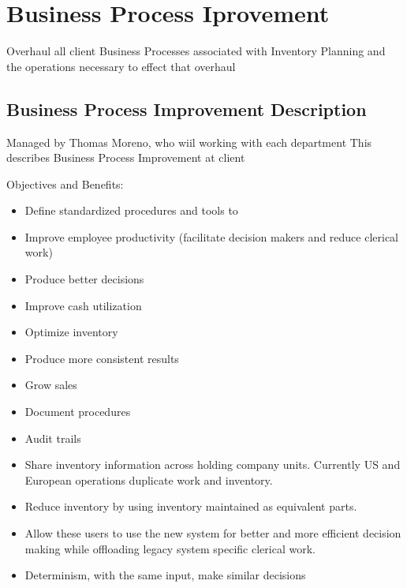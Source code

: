 \documentclass[letterpaper,10pt,english]{sphinxmanual}
\begin{document}
\chapter{Business Process Iprovement}
\label{Introduction/Business-process-improvement::doc}\label{Introduction/Business-process-improvement:business-process-iprovement}
Overhaul all client Business Processes associated with Inventory Planning and the operations necessary to effect that overhaul


\section{Business Process Improvement Description}
\label{Introduction/Business-process-improvement:business-process-improvement-description}
Managed by Thomas Moreno, who wiil working with each department
This describes Business Process Improvement at client

Objectives and Benefits:
\begin{itemize}
\item {} 
Define standardized procedures and tools to

\item {} 
Improve employee productivity (facilitate decision makers and reduce clerical work)

\item {} 
Produce better decisions

\item {} 
Improve cash utilization

\item {} 
Optimize inventory

\item {} 
Produce more consistent results

\item {} 
Grow sales

\item {} 
Document procedures

\item {} 
Audit trails

\item {} 
Share inventory information across holding company units.  Currently US and European operations duplicate work and inventory.

\item {} 
Reduce inventory by using inventory maintained as equivalent parts.

\item {} 
Allow these users to use the new system for better and more efficient decision making while offloading legacy system specific clerical work.

\item {} 
Determinism, with the same input, make similar decisions

\end{itemize}
\end{document}
